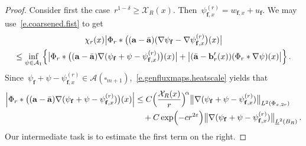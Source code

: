 \documentclass[11pt,twoside]{article} %
\let\oldsquare\square %
\renewcommand{\square}{\oldsquare}
\numberwithin{equation}{section}
\theoremstyle{definition}
\newcommand{\eps}{\varepsilon}
\renewcommand{\b}{\ensuremath{\mathbf{b}}}
\newcommand{\f}{\mathbf{f}}
\newcommand{\ep}{\eps}
\renewcommand{\a}{\mathbf{a}}
\newcommand{\ahom}{\bar{\a}}
\newcommand{\cu}{\square}
\newcommand{\X}{\mathcal{X}}
\newcommand{\minscale}{\chi}
\newcommand{\A}{\mathcal{A}}
\begin{document}
\begin{proof}
Consider first the case~$r^{1-\delta} \geq \X_{R}(x)$. Then~$\psi_{\f,x}^{(r)} = w_{\f,x} + u_{\f}$.  We may use~\eqref{e.coarsened.fist} to get
\begin{multline}   \label{e.fr.correctorloc.pre0}
\minscale_{r}(x)  
\bigl| 
\Phi_r \ast  \bigl( (\a - \ahom)( \nabla \psi_{\f}  -  \nabla \psi_{\f,x}^{(r)}  \bigr) (x) 
\bigr| 
\\ 
\leq 
\inf_{\psi \in \A_1} 
\Bigl\{ 
\bigl| 
\Phi_r \ast  \bigl(  (\a - \ahom) \nabla (\psi_{\f}  + \psi -  \psi_{\f,x}^{(r)})  \bigr)(x) 
\bigr| 
+
\bigl|  (\ahom - \b_{r}'(x)) (\Phi_r \ast \nabla \psi)(x) \bigr| 
\Bigr\}
\,.
\end{multline}
Since~$\psi_{\f}  + \psi -  \psi_{\f,x}^{(r)} \in \A(\cu_{m+1})$,~\eqref{e.genfluxmaps.heatscale} yields that
\begin{align}  \label{e.fr.correctorloc.pre1}
\Bigl| 
\Phi_r \ast  \bigl(  (\a - \ahom) \nabla (\psi_{\f}  + \psi -  \psi_{\f,x}^{(r)})  \bigr)(x) 
\Bigr| 
& 
\leq 
C \Bigl( \frac{\X_R(x)}{r} \Bigr)^{\! \alpha} \big\| \nabla (\psi_{\f}  + \psi -  \psi_{\f,x}^{(r)} )\big\|_{L^2(\Phi_{x,2r})} 
\notag \\ 
&  
\quad 
+ 
C \exp\Bigl( - c r^{2\ep} \Bigr)\big\| \nabla (\psi_{\f}  + \psi -  \psi_{\f,x}^{(r)})\big\|_{\underline{L}^2(B_{R})} 
\,.
\end{align}
Our intermediate task is to estimate the first term on the right.  

\smallskip


\end{proof}
\end{document}
